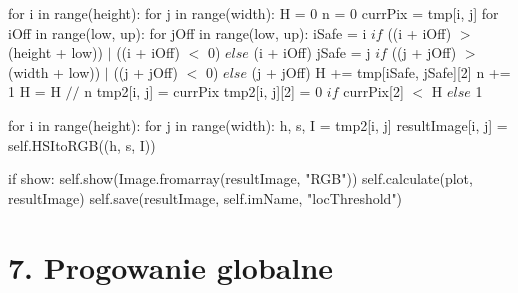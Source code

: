 \documentclass[final,a4paper,openany,12pt]{mwbk}
\begin{document}
\indent for i in range(height): \newline
\indent for j in range(width): \newline
\indent H = 0 \newline
\indent n = 0 \newline
\indent currPix = tmp[i, j] \newline
\indent for iOff in range(low, up): \newline
\indent for jOff in range(low, up): \newline
\indent iSafe = i $if$ ((i + iOff) $>$ (height + low)) $\mid$ ((i + iOff) $<$ 0) $else$ (i + iOff) \newline
\indent jSafe = j $if$ ((j + jOff) $>$ (width + low)) $\mid$ ((j + jOff) $<$ 0) $else$ (j + jOff) \newline
\indent H += tmp[iSafe, jSafe][2] \newline
\indent n += 1 \newline
\indent H = H $//$ n \newline
\indent tmp2[i, j] = currPix \newline
\indent tmp2[i, j][2] = 0 $if$ currPix[2] $<$ H $else$ 1 \newline

\indent for i in range(height): \newline
\indent for j in range(width): \newline
\indent h, s, I = tmp2[i, j] \newline
\indent resultImage[i, j] = self.HSItoRGB((h, s, I)) \newline

\indent if show: \newline
\indent self.show(Image.fromarray(resultImage, "RGB")) \newline
\indent self.calculate(plot, resultImage) \newline
\indent self.save(resultImage, self.imName, "locThreshold") \newline
\newpage

\section*{7. Progowanie globalne}
\end{document}
